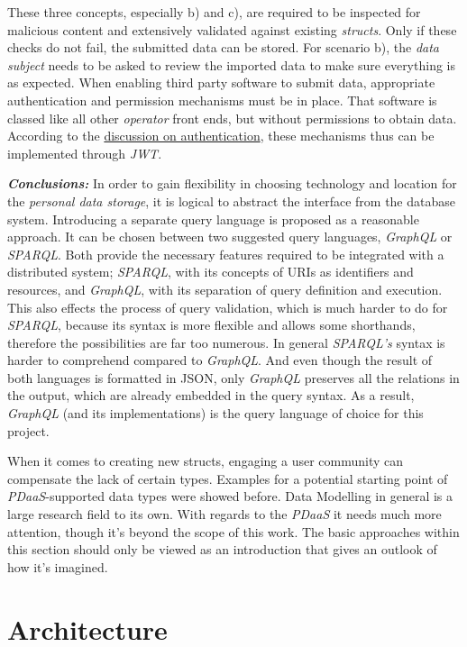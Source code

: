 \documentclass[12pt,english,a4paper,titlepage,cleardoublepage=empty,dottedtoc]{report}
\begin{document}
These three concepts, especially b) and c), are required to be inspected
for malicious content and extensively validated against existing
\emph{structs}. Only if these checks do not fail, the submitted data can
be stored. For scenario b), the \emph{data subject} needs to be asked to
review the imported data to make sure everything is as expected. When
enabling third party software to submit data, appropriate authentication
and permission mechanisms must be in place. That software is classed
like all other \emph{operator} front ends, but without permissions to
obtain data. According to the
\protect\hyperlink{authentication}{discussion on authentication}, these
mechanisms thus can be implemented through \emph{JWT}.

\emph{\textbf{Conclusions:}} In order to gain flexibility in choosing
technology and location for the \emph{personal data storage}, it is
logical to abstract the interface from the database system. Introducing
a separate query language is proposed as a reasonable approach. It can
be chosen between two suggested query languages, \emph{GraphQL} or
\emph{SPARQL}. Both provide the necessary features required to be
integrated with a distributed system; \emph{SPARQL}, with its concepts
of URIs as identifiers and resources, and \emph{GraphQL}, with its
separation of query definition and execution. This also effects the
process of query validation, which is much harder to do for
\emph{SPARQL}, because its syntax is more flexible and allows some
shorthands, therefore the possibilities are far too numerous. In general
\emph{SPARQL's} syntax is harder to comprehend compared to
\emph{GraphQL}. And even though the result of both languages is
formatted in JSON, only \emph{GraphQL} preserves all the relations in
the output, which are already embedded in the query syntax. As a result,
\emph{GraphQL} (and its implementations) is the query language of choice
for this project.

When it comes to creating new structs, engaging a user community can
compensate the lack of certain types. Examples for a potential starting
point of \emph{PDaaS}-supported data types were showed before. Data
Modelling in general is a large research field to its own. With regards
to the \emph{PDaaS} it needs much more attention, though it's beyond the
scope of this work. The basic approaches within this section should only
be viewed as an introduction that gives an outlook of how it's imagined.

\section{Architecture}\label{architecture}
\end{document}
